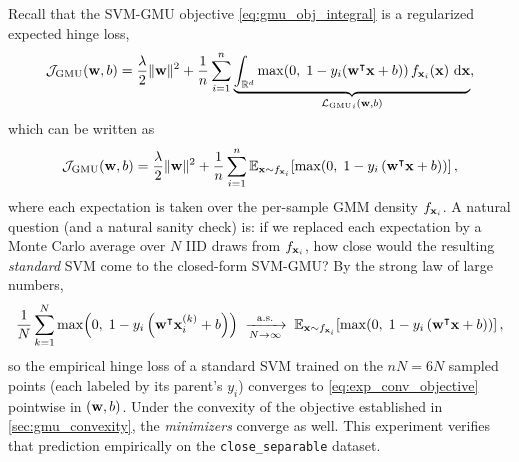 \documentclass[11pt, letterpaper]{article}
\newcommand{\E}{\mathbb{E}}
\newcommand{\R}{\mathbb{R}}
\newcommand{\loss}{\mathcal{L}}
\newcommand{\obj}{\mathcal{J}}
\begin{document}
Recall that the SVM-GMU objective \cref{eq:gmu_obj_integral} is a regularized expected hinge loss,
\begin{equation*}
    \obj_{\text{GMU}}(\vb{w}, b) = \frac{\lambda}{2}\|\vb{w}\|^2 + \frac{1}{n}\sum_{i=1}^{n} \underbrace{\int_{\R^d} \max\!\left(0,\; 1 - y_i\!\left(\vb{w}^{\intercal} \vb{x} + b\right)\right) f_{\vb{x}_i}(\vb{x})\, \dd{\vb{x}}}_{{\loss_{\text{GMU}}}_{i}(\vb{w}, b)},
\end{equation*}
which can be written as
\begin{equation}\label{eq:exp_conv_objective}
    \obj_{\text{GMU}}(\vb{w}, b) = \frac{\lambda}{2}\|\vb{w}\|^2 + \frac{1}{n}\sum_{i=1}^{n}\E_{\vb{x}\sim f_{\vb{x}_i}}\!\left[\max\!\left(0,\; 1 - y_i\left(\vb{w}^{\intercal}\vb{x} + b\right)\right)\right],
\end{equation}
where each expectation is taken over the per-sample GMM density $f_{\vb{x}_i}$. A natural question (and a natural sanity check) is: if we replaced each expectation by a Monte Carlo average over $N$ IID draws from $f_{\vb{x}_i}$, how close would the resulting \emph{standard} SVM come to the closed-form SVM-GMU? By the strong law of large numbers,
\begin{equation}\label{eq:exp_lln}
    \frac{1}{N}\sum_{k=1}^{N} \max\!\left(0,\; 1 - y_i\left(\vb{w}^{\intercal}\vb{x}_i^{(k)} + b\right)\right) \;\xrightarrow[N\to\infty]{\text{a.s.}}\; \E_{\vb{x}\sim f_{\vb{x}_i}}\!\left[\max\!\left(0,\; 1 - y_i\left(\vb{w}^{\intercal}\vb{x} + b\right)\right)\right],
\end{equation}
so the empirical hinge loss of a standard SVM trained on the $nN = 6N$ sampled points (each labeled by its parent's $y_i$) converges to \cref{eq:exp_conv_objective} pointwise in $(\vb{w}, b)$. Under the convexity of the objective established in \cref{sec:gmu_convexity}, the \emph{minimizers} converge as well. This experiment verifies that prediction empirically on the \texttt{close\_separable} dataset.
\end{document}
